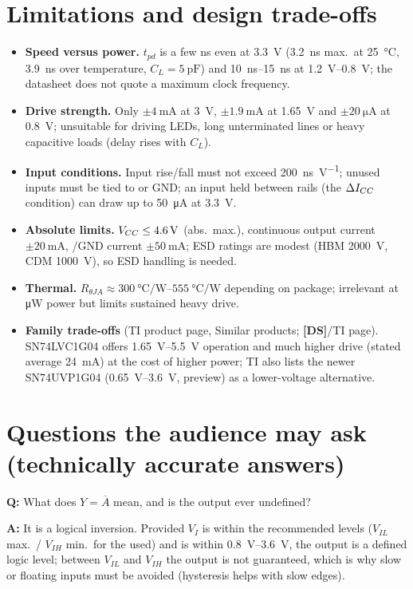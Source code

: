 \documentclass[11pt,a4paper]{article}
\newcommand{\DS}{\textbf{[DS]}}
\newcommand{\qa}[2]{\par\smallskip\textbf{Q:} #1\par\textbf{A:} #2\par}
\begin{document}
\section{Limitations and design trade-offs}
\begin{itemize}
  \item \textbf{Speed versus power.} $t_{pd}$ is a few ns even at \SI{3.3}{\volt} (\SI{3.2}{\nano\second} max.\ at \SI{25}{\celsius}, \SI{3.9}{\nano\second} over temperature, $C_L=\SI{5}{\pico\farad}$) and \SIrange{10}{15}{\nano\second} at \SIrange{1.2}{0.8}{\volt}; the datasheet does not quote a maximum clock frequency.
  \item \textbf{Drive strength.} Only $\pm\SI{4}{\milli\ampere}$ at \SI{3}{\volt}, $\pm\SI{1.9}{\milli\ampere}$ at \SI{1.65}{\volt} and $\pm\SI{20}{\micro\ampere}$ at \SI{0.8}{\volt}; unsuitable for driving LEDs, long unterminated lines or heavy capacitive loads (delay rises with $C_L$).
  \item \textbf{Input conditions.} Input rise/fall must not exceed \SI{200}{\nano\second\per\volt}; unused inputs must be tied to \Vcc{} or GND; an input held between rails (the $\Delta I_{CC}$ condition) can draw up to \SI{50}{\micro\ampere} at \SI{3.3}{\volt}.
  \item \textbf{Absolute limits.} $V_{CC}\le\SI{4.6}{\volt}$ (abs.\ max.), continuous output current $\pm\SI{20}{\milli\ampere}$, \Vcc/GND current $\pm\SI{50}{\milli\ampere}$; ESD ratings are modest (HBM \SI{2000}{\volt}, CDM \SI{1000}{\volt}), so ESD handling is needed.
  \item \textbf{Thermal.} $R_{\theta JA}\approx\SIrange{300}{555}{\celsius\per\watt}$ depending on package; irrelevant at \si{\micro\watt} power but limits sustained heavy drive.
  \item \textbf{Family trade-offs} (TI product page, Similar products; \DS/TI page). SN74LVC1G04 offers \SIrange{1.65}{5.5}{\volt} operation and much higher drive (stated average \SI{24}{\milli\ampere}) at the cost of higher power; TI also lists the newer SN74UVP1G04 (\SIrange{0.65}{3.6}{\volt}, preview) as a lower-voltage alternative.
\end{itemize}

\section{Questions the audience may ask (technically accurate answers)}
\qa{What does $Y=\overline{A}$ mean, and is the output ever undefined?}
   {It is a logical inversion. Provided $V_I$ is within the recommended levels ($V_{IL}$ max.\ / $V_{IH}$ min.\ for the \Vcc{} used) and \Vcc{} is within \SIrange{0.8}{3.6}{\volt}, the output is a defined logic level; between $V_{IL}$ and $V_{IH}$ the output is not guaranteed, which is why slow or floating inputs must be avoided (hysteresis helps with slow edges).}
\end{document}
